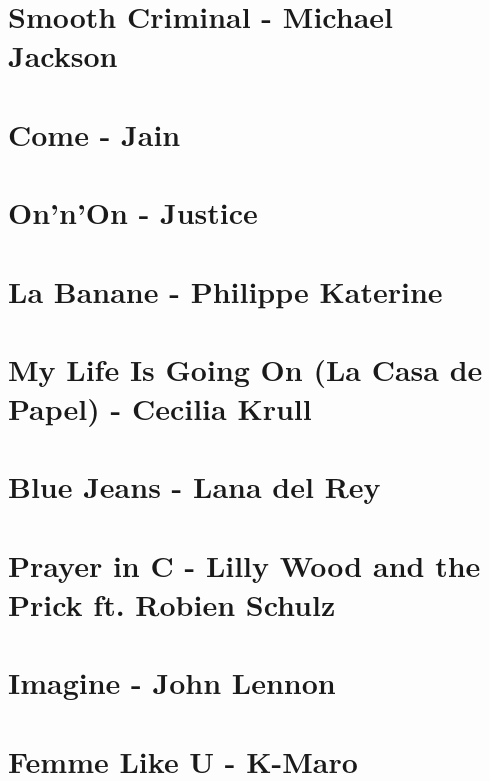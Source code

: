 \documentclass[11pt]{article}
\begin{document}
\section{Smooth Criminal - Michael Jackson}
\begin{guitar}

\end{guitar}

\section{Come - Jain}
\begin{guitar}

\end{guitar}

\section{On'n'On - Justice}


\section{La Banane - Philippe Katerine}


\section{My Life Is Going On (La Casa de Papel) - Cecilia Krull }
\begin{guitar}

\end{guitar}

\section{Blue Jeans - Lana del Rey}


\section{Prayer in C - Lilly Wood and the Prick ft. Robien Schulz}



\section{Imagine - John Lennon}


\section{Femme Like U - K-Maro}

\end{document}
